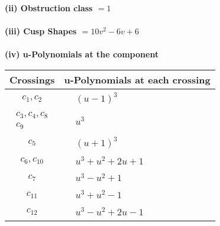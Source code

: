 \documentclass[1p]{elsarticle_modified}
\theoremstyle{definition}
\begin{document}
\flushleft \textbf{(ii) Obstruction class $= 1$}\\~\\
\flushleft \textbf{(iii) Cusp Shapes $= 10 v^2-6 v+6$}\\~\\
\newpage\renewcommand{\arraystretch}{1}
\flushleft \textbf{(iv) u-Polynomials at the component}\newline \\
\begin{tabular}{m{50pt}|m{274pt}}
Crossings & \hspace{64pt}u-Polynomials at each crossing \\
\hline $$\begin{aligned}c_{1},c_{2}\end{aligned}$$&$\begin{aligned}
&(u-1)^3
\end{aligned}$\\
\hline $$\begin{aligned}c_{3},c_{4},c_{8}\\c_{9}\end{aligned}$$&$\begin{aligned}
&u^3
\end{aligned}$\\
\hline $$\begin{aligned}c_{5}\end{aligned}$$&$\begin{aligned}
&(u+1)^3
\end{aligned}$\\
\hline $$\begin{aligned}c_{6},c_{10}\end{aligned}$$&$\begin{aligned}
&u^3+u^2+2 u+1
\end{aligned}$\\
\hline $$\begin{aligned}c_{7}\end{aligned}$$&$\begin{aligned}
&u^3- u^2+1
\end{aligned}$\\
\hline $$\begin{aligned}c_{11}\end{aligned}$$&$\begin{aligned}
&u^3+u^2-1
\end{aligned}$\\
\hline $$\begin{aligned}c_{12}\end{aligned}$$&$\begin{aligned}
&u^3- u^2+2 u-1
\end{aligned}$\\
\hline
\end{tabular}\\~\\
\end{document}

